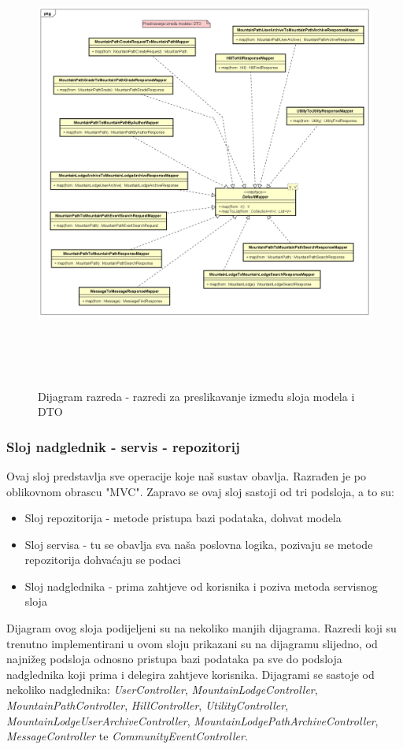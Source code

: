 		\begin{figure}[H]
			\includegraphics[scale=0.6, height=150mm, width=165mm]{dijagrami/model-mapper.png} %
			\centering
			\caption{Dijagram razreda - razredi za preslikavanje između sloja modela i DTO}
			\label{fig:dijagrami_razreda3}
		\end{figure}
			\newpage
			\subsubsection{Sloj nadglednik - servis - repozitorij}
			Ovaj sloj predstavlja sve operacije koje naš sustav obavlja. Razrađen je po oblikovnom obrascu "MVC". Zapravo se ovaj sloj sastoji od tri podsloja, a to su: 
			\begin{itemize}
				\item 
					Sloj repozitorija - metode pristupa bazi podataka, dohvat modela
				\item
					Sloj servisa - tu se obavlja sva naša poslovna logika, pozivaju se metode repozitorija dohvaćaju se podaci
				\item Sloj nadglednika - prima zahtjeve od korisnika i poziva metoda servisnog sloja	
			\end{itemize}
			Dijagram ovog sloja podijeljeni su na nekoliko manjih dijagrama.
			Razredi koji su trenutno implementirani u ovom sloju prikazani su na dijagramu slijedno, od najnižeg podsloja odnosno pristupa bazi podataka pa sve do podsloja nadglednika koji prima i delegira zahtjeve korisnika.
			Dijagrami se sastoje od nekoliko nadglednika: \textit{UserController}, \textit{MountainLodgeController}, \textit{MountainPathController}, \textit{HillController}, \textit{UtilityController}, \textit{MountainLodgeUserArchiveController}, \textit{MountainLodgePathArchiveController}, \textit{MessageController} te \textit{CommunityEventController}.
			
